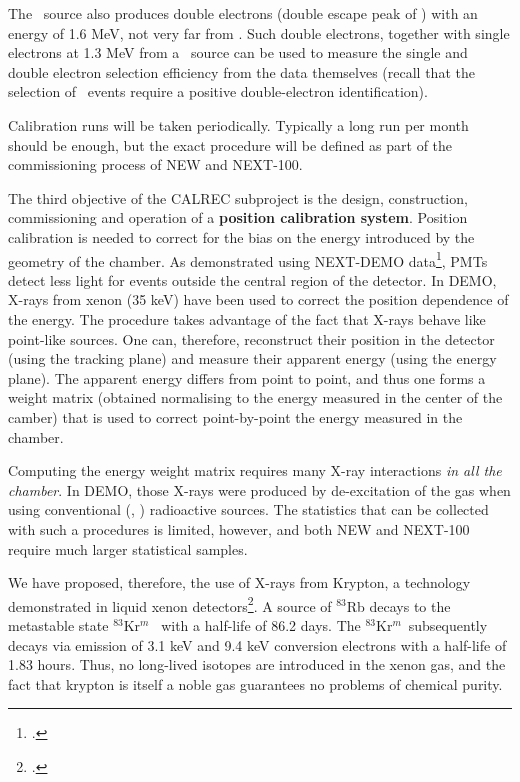The \TL\ source also produces double electrons (double escape peak of \TL) with an energy of 1.6 MeV, not very far from \Qbb. Such double electrons, together with single electrons at 1.3 MeV from a \NA\ source can be used to measure the single and double electron selection efficiency from the data themselves (recall that the selection of \bb\ events require a positive double-electron identification).

Calibration runs will be taken periodically. Typically a long run per month should be enough, but the exact procedure will be defined as part of the commissioning process of NEW and NEXT-100. 

The third objective of the CALREC subproject is the design, construction, commissioning and operation of a {\bf position calibration system}. Position calibration is needed to correct for the bias on the energy introduced by the geometry of the chamber. As demonstrated using NEXT-DEMO data\footcite{Lorca:2014sra}, PMTs detect less light for events outside the central region of the detector. In DEMO, X-rays from xenon (35 keV) have been used to correct the position dependence of the energy. The procedure takes advantage of the fact that X-rays behave like point-like sources. One can, therefore, reconstruct their position in the detector (using the tracking plane) and measure their apparent energy (using the energy plane). The apparent energy differs from point to point, and thus one forms a weight matrix  (obtained normalising to the energy measured in the center of the camber) that is used to correct point-by-point the energy measured in the chamber.

Computing the energy weight matrix requires many X-ray interactions {\em in all the chamber}. In DEMO, those X-rays were produced by de-excitation of the gas when using conventional (\NA, \CS) radioactive sources. The statistics that can be collected with such a procedures is limited, however, and both NEW and NEXT-100 require much larger statistical samples.

We have proposed, therefore, the use of X-rays from Krypton, a technology demonstrated in liquid xenon detectors\footcite{Kastens:2009rt}. A source of $^{83}$Rb
decays to the metastable state  $^{83}$Kr$^m$~ with a half-life of 86.2 days. The
$^{83}$Kr$^m$~subsequently decays via emission of 3.1 keV and 9.4 keV conversion electrons with a half-life of 1.83 hours. Thus, no long-lived isotopes are introduced in the xenon gas, and the fact that krypton is itself a noble gas guarantees no problems of chemical purity.  

